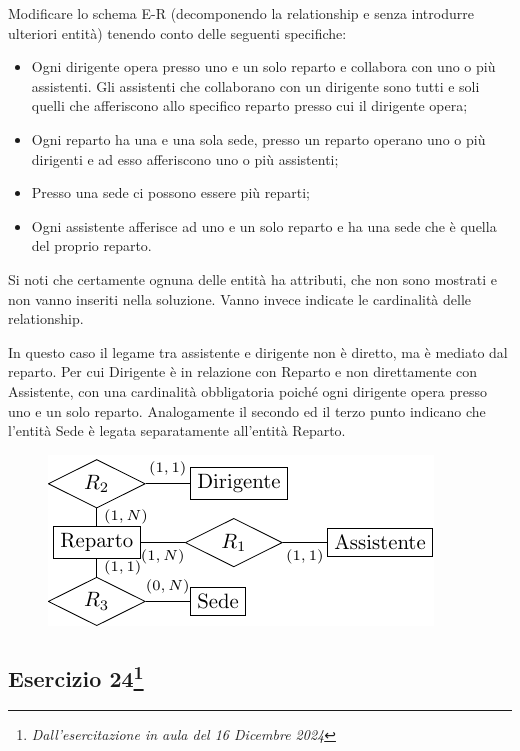\documentclass{article}
\begin{document}
Modificare lo schema E-R (decomponendo la relationship e senza introdurre ulteriori entità) tenendo conto delle
seguenti specifiche:

\begin{itemize}
    \item Ogni dirigente opera presso uno e un solo reparto e collabora con uno o più assistenti. Gli assistenti che
    collaborano con un dirigente sono tutti e soli quelli che afferiscono allo specifico reparto presso cui il
    dirigente opera;
    \item Ogni reparto ha una e una sola sede, presso un reparto operano uno o più dirigenti e ad esso afferiscono
    uno o più assistenti;
    \item Presso una sede ci possono essere più reparti;
    \item Ogni assistente afferisce ad uno e un solo reparto e ha una sede che è quella del proprio reparto. 
\end{itemize}

Si noti che certamente ognuna delle entità ha attributi, che non sono mostrati e non vanno inseriti nella soluzione.
Vanno invece indicate le cardinalità delle relationship.

In questo caso il legame tra assistente e dirigente non è diretto, ma è mediato dal reparto. Per cui Dirigente è in relazione con Reparto e non direttamente con Assistente, con una cardinalità obbligatoria poiché ogni dirigente opera presso uno e un solo reparto. Analogamente il secondo ed il terzo punto indicano che l'entità Sede è legata separatamente all'entità Reparto. 

\begin{figure}[H]%
    \centering%
    \includegraphics[scale=1.2]{schema_5_16-12-24.pdf}%
\end{figure}

\subsection{Esercizio 24\footnote{\textit{Dall'esercitazione in aula del 16 Dicembre 2024}}}
\end{document}

